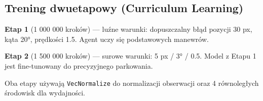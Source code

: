 \documentclass[11pt]{article}
\begin{document}
    \hypertarget{trening-dwuetapowy-curriculum-learning}{%
\subsection{Trening dwuetapowy (Curriculum
Learning)}\label{trening-dwuetapowy-curriculum-learning}}

\textbf{Etap 1} (1 000 000 kroków) --- luźne warunki: dopuszczalny błąd
pozycji 30 px, kąta 20°, prędkości 1.5. Agent uczy się podstawowych
manewrów.

\textbf{Etap 2} (1 500 000 kroków) --- surowe warunki: 5 px / 3° / 0.5.
Model z Etapu 1 jest fine-tunowany do precyzyjnego parkowania.

Oba etapy używają \texttt{VecNormalize} do normalizacji obserwacji oraz
4 równoległych środowisk dla wydajności.
\end{document}
